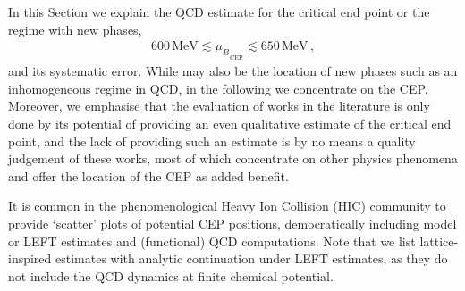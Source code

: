 \documentclass[reprint,twocolumn,superscriptaddress,preprintnumbers,amsmath,amssymb,aps,prd,floatfix]{revtex4-2}
\begin{document}
In this Section we explain the QCD estimate for the critical end point or the regime with new phases, 
%
\begin{align}
600\,\textrm{MeV} \lesssim {\mu_B}_{_{\mathrm{CEP}}}\lesssim 650\, \textrm{MeV}\,,
\label{eq:CEPEstimateQCD-Suppl}
\end{align}
%
and its systematic error. While  may also be the location of new phases such as an inhomogeneous regime in QCD, in the following we concentrate on the CEP. Moreover, we emphasise that the evaluation of works in the literature is only done by its potential of providing an even qualitative estimate of the critical end point, and the lack of providing such an estimate is by no means a quality judgement of these works, most of which concentrate on other physics phenomena and offer the location of the CEP as added benefit.

It is common in the phenomenological Heavy Ion Collision (HIC) community to provide `scatter' plots of potential CEP positions, democratically including model or LEFT estimates and (functional) QCD computations. Note that we list lattice-inspired estimates with analytic continuation under LEFT estimates, as they do not include the QCD dynamics at finite chemical potential.
\end{document}
